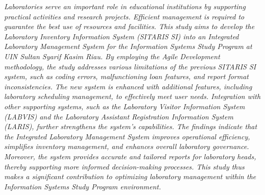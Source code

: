 \noindent
\fontsize{10pt}{12pt}\selectfont
\emph{Laboratories serve an important role in educational institutions by supporting practical activities and research projects. Efficient management is required to guarantee the best use of resources and facilities. This study aims to develop the Laboratory Inventory Information System (SITARIS SI) into an Integrated Laboratory Management System for the Information Systems Study Program at UIN Sultan Syarif Kasim Riau. By employing the Agile Development methodology, the study addresses various limitations of the previous SITARIS SI system, such as coding errors, malfunctioning loan features, and report format inconsistencies. The new system is enhanced with additional features, including laboratory scheduling management, to effectively meet user needs. Integration with other supporting systems, such as the Laboratory Visitor Information System (LABVIS) and the Laboratory Assistant Registration Information System (LARIS), further strengthens the system's capabilities. The findings indicate that the Integrated Laboratory Management System improves operational efficiency, simplifies inventory management, and enhances overall laboratory governance. Moreover, the system provides accurate and tailored reports for laboratory heads, thereby supporting more informed decision-making processes. This study thus makes a significant contribution to optimizing laboratory management within the Information Systems Study Program environment.}\\
 \\